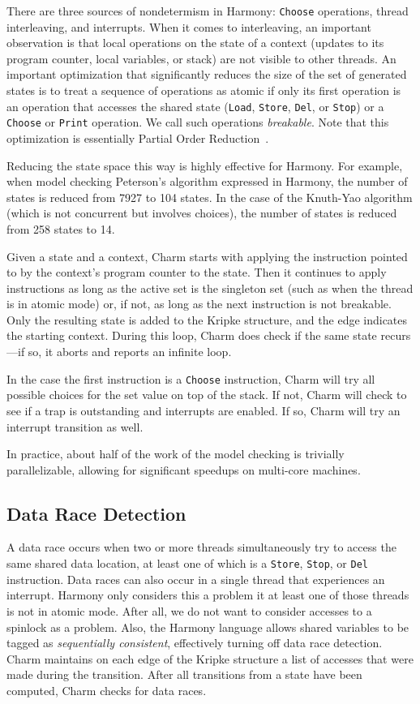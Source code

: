 \documentclass[twocolumn]{article}
\begin{document}
There are three sources of nondetermism in Harmony: \texttt{Choose}
operations, thread interleaving, and interrupts.
When it comes to interleaving, an important observation is that
local operations on the state of a context (updates to its program
counter, local variables, or stack) are not visible to other threads.
An important optimization that significantly
reduces the size of the set of generated states is to treat a
sequence of operations as atomic if only its first operation is an
operation that accesses the shared state (\texttt{Load}, \texttt{Store},
\texttt{Del}, or \texttt{Stop}) or a \texttt{Choose} or \texttt{Print}
operation.  We call such operations \emph{breakable}.
Note that this optimization is essentially Partial Order
Reduction~\cite{Val91}.

Reducing the state space this way is highly effective for Harmony.
For example, when model checking Peterson's algorithm expressed in
Harmony, the number of states is reduced from 7927 to 104 states.
In the case of the Knuth-Yao algorithm (which is not concurrent but
involves choices), the number of states is reduced from 258 states
to 14.

Given a state and a context, Charm starts with applying the instruction
pointed to by the context's program counter to the state.
Then it continues to apply instructions as long as
the active set is the singleton set (such as when the thread is in
atomic mode) or, if not, as long as the next instruction is not
breakable.  Only the resulting state is added to the Kripke structure,
and the edge indicates the starting context.  During this loop, Charm
does check if the same state recurs---if so, it aborts
and reports an infinite loop.

In the case the first instruction is a \texttt{Choose} instruction,
Charm will try all possible choices for the set value
on top of the stack.  If not, Charm will check to
see if a trap is outstanding and interrupts are enabled.  If so,
Charm will try an interrupt transition as well.

In practice, about half of the work of the model checking is trivially
parallelizable, allowing for significant speedups on multi-core machines.

\subsection{Data Race Detection}

A data race occurs when two or more threads simultaneously try to
access the same shared data location, at least one of which is a
\texttt{Store}, \texttt{Stop}, or \texttt{Del} instruction.  Data races
can also occur in a single thread that experiences an interrupt.  Harmony
only considers this a problem it at least one of those threads is
not in atomic mode.  After all, we do not want to consider accesses
to a spinlock as a problem.  Also, the Harmony language allows
shared variables to be tagged as \emph{sequentially consistent},
effectively turning off data race detection.  Charm maintains on
each edge of the Kripke structure a list of accesses that were made
during the transition.  After all transitions from a state have been
computed, Charm checks for data races.
\end{document}
